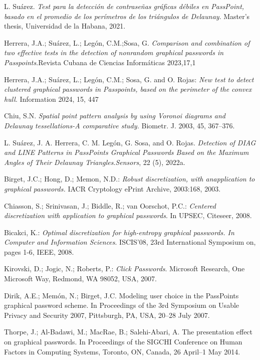 \documentclass[12pt]{report}
\begin{document}
\begin{thebibliography}{9}
{		L. Suárez. \textit{Test para la detección de contraseñas gráficas débiles en PassPoint, basado en el promedio de los	perímetros de los triángulos de Delaunay}. Master’s thesis, Universidad de la Habana, 2021.
		
		Herrera, J.A.; Suárez, L.; Legón, C.M.;Sosa, G.
		\textit{Comparison and combination of two effective tests in the detection of nonrandom graphical
		passwords in Passpoints}.Revista Cubana de Ciencias Informáticas 2023,17,1
		
		 Herrera, J.A.; Suárez, L.; Legón, C.M.; Sosa, G. and O. Rojas: \textit{New test to detect clustered graphical passwords   in Passpoints, based on the perimeter of the convex hull}. Information 2024, 15, 447
		
		 Chiu, S.N.\textit{ Spatial point pattern analysis by using Voronoi diagrams and Delaunay tessellations-A comparative study.} Biometr. J.
		2003, 45, 367–376.
		
		 L. Suárez, J. A. Herrera, C. M. Legón, G. Sosa, and O. Rojas. \textit{Detection of DIAG and LINE Patterns in PassPoints Graphical Passwords Based on the Maximum Angles of Their Delaunay Triangles}.\textit{Sensors}, 22
		(5), 2022a.
		
		 Birget, J.C.; Hong, D.; Memon, N.D.: \textit{Robust discretization, with anapplication to graphical passwords.} IACR Cryptology ePrint Archive,
		2003:168, 2003.
		
		Chiasson, S.; Srinivasan, J.; Biddle, R.; van Oorschot, P.C.: \textit{Centered discretization with application to graphical passwords}. In UPSEC,
		Citeseer, 2008.
		
		Bicakci, K.: \textit{Optimal discretization for high-entropy graphical passwords. In Computer and Information Sciences}. ISCIS'08, 23rd International
		Symposium on, pages 1-6, IEEE, 2008.
		
		Kirovski, D.; Jogic, N.; Roberts, P.: \textit{Click Passwords}. Microsoft Research, One Microsoft Way, Redmond, WA 98052, USA, 2007.
		
		Dirik, A.E.; Memón, N.; Birget, J.C. Modeling user choice in the PassPoints graphical password scheme. In Proceedings of the 3rd
		Symposium on Usable Privacy and Security 2007, Pittsburgh, PA, USA, 20–28 July 2007.
		
		Thorpe, J.; Al-Badawi, M.; MacRae, B.; Salehi-Abari, A. The presentation effect on graphical passwords. In Proceedings of the SIGCHI Conference on Human Factors in Computing Systems, Toronto, ON, Canada, 26 April–1 May 2014.
		
}
\end{thebibliography}
\end{document}
